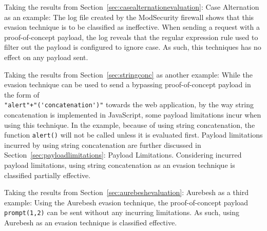Taking the results from Section~\ref{sec:casealternationevaluation}: Case Alternation as an example: The log file created by the ModSecurity firewall shows that this evasion technique is to be classified as ineffective. When sending a request with a proof-of-concept payload, the log reveals that the regular expression rule used to filter out the payload is configured to ignore case. As such, this techniques has no effect on any payload sent.

Taking the results from Section~\ref{sec:stringconc} as another example: While the evasion technique can be used to send a bypassing proof-of-concept payload in the form of \\ \verb|"alert"+"('concatenation')"| towards the web application, by the way string concatenation is implemented in JavaScript, some payload limitations incur when using this technique. In the example, because of using string concatenation, the function \verb|alert()| will not be called unless it is evaluated first. Payload limitations incurred by using string concatenation are further discussed in Section~\ref{sec:payloadlimitations}: Payload Limitations. Considering incurred payload limitations, using string concatenation as an evasion technique is classified partially effective.

Taking the results from Section~\ref{sec:aurebeshevaluation}: Aurebesh as a third example: Using the Aurebesh evasion technique, the proof-of-concept payload \verb|prompt(1,2)| can be sent without any incurring limitations. As such, using Aurebesh as an evasion technique is classified effective.

